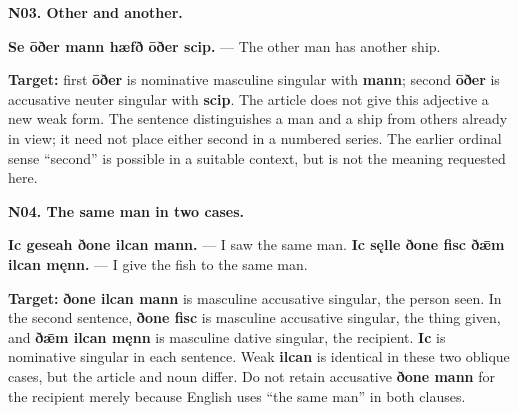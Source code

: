 \par\begin{minipage}{\linewidth}\raggedright
\textbf{N03. Other and another.}

\textbf{Se ōðer mann hæfð ōðer scip.} — The other man has another ship.

\textbf{Target:} first \textbf{ōðer} is nominative masculine singular with \textbf{mann}; second \textbf{ōðer} is accusative neuter singular with \textbf{scip}. The article does not give this adjective a new weak form. The sentence distinguishes a man and a ship from others already in view; it need not place either second in a numbered series. The earlier ordinal sense “second” is possible in a suitable context, but is not the meaning requested here.

\end{minipage}\par\addvspace{4pt}

\par\begin{minipage}{\linewidth}\raggedright
\textbf{N04. The same man in two cases.}

\textbf{Ic geseah ðone ilcan mann.} — I saw the same man. \textbf{Ic sęlle ðone fisc ðǣm ilcan męnn.} — I give the fish to the same man.

\textbf{Target:} \textbf{ðone ilcan mann} is masculine accusative singular, the person seen. In the second sentence, \textbf{ðone fisc} is masculine accusative singular, the thing given, and \textbf{ðǣm ilcan męnn} is masculine dative singular, the recipient. \textbf{Ic} is nominative singular in each sentence. Weak \textbf{ilcan} is identical in these two oblique cases, but the article and noun differ. Do not retain accusative \textbf{ðone mann} for the recipient merely because English uses “the same man” in both clauses.

\end{minipage}\par\addvspace{4pt}

